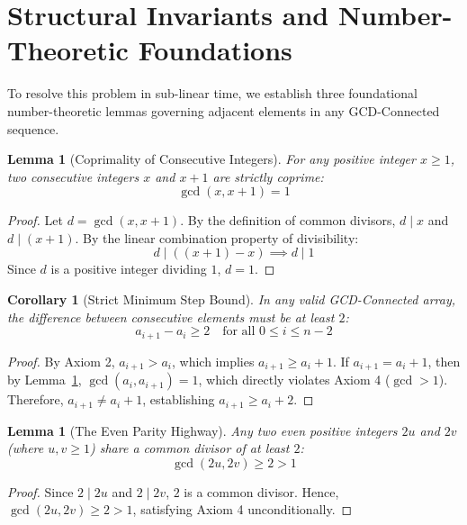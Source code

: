 \documentclass[10pt,journal,compsoc,onecolumn]{IEEEtran}
\newtheorem{lemma}[theorem]{Lemma}
\newtheorem{corollary}[theorem]{Corollary}
\begin{document}
\section{Structural Invariants and Number-Theoretic Foundations}
\label{sec:invariants}

To resolve this problem in sub-linear time, we establish three foundational number-theoretic lemmas governing adjacent elements in any GCD-Connected sequence.

\begin{lemma}[Coprimality of Consecutive Integers]
\label{lem:coprime}
For any positive integer $x \ge 1$, two consecutive integers $x$ and $x + 1$ are strictly coprime:
\begin{equation}
\gcd(x, x + 1) = 1
\end{equation}
\end{lemma}
\begin{proof}
Let $d = \gcd(x, x + 1)$. By the definition of common divisors, $d \mid x$ and $d \mid (x + 1)$. By the linear combination property of divisibility:
\begin{equation}
d \mid ((x + 1) - x) \implies d \mid 1
\end{equation}
Since $d$ is a positive integer dividing $1$, $d = 1$.
\end{proof}

\begin{corollary}[Strict Minimum Step Bound]
\label{cor:min_step}
In any valid GCD-Connected array, the difference between consecutive elements must be at least $2$:
\begin{equation}
a_{i+1} - a_i \ge 2 \quad \text{for all } 0 \le i \le n - 2
\end{equation}
\end{corollary}
\begin{proof}
By Axiom 2, $a_{i+1} > a_i$, which implies $a_{i+1} \ge a_i + 1$. If $a_{i+1} = a_i + 1$, then by Lemma~\ref{lem:coprime}, $\gcd(a_i, a_{i+1}) = 1$, which directly violates Axiom 4 ($\gcd > 1$). Therefore, $a_{i+1} \neq a_i + 1$, establishing $a_{i+1} \ge a_i + 2$.
\end{proof}

\begin{lemma}[The Even Parity Highway]
\label{lem:even_highway}
Any two even positive integers $2u$ and $2v$ (where $u, v \ge 1$) share a common divisor of at least $2$:
\begin{equation}
\gcd(2u, 2v) \ge 2 > 1
\end{equation}
\end{lemma}
\begin{proof}
Since $2 \mid 2u$ and $2 \mid 2v$, $2$ is a common divisor. Hence, $\gcd(2u, 2v) \ge 2 > 1$, satisfying Axiom 4 unconditionally.
\end{proof}
\end{document}
